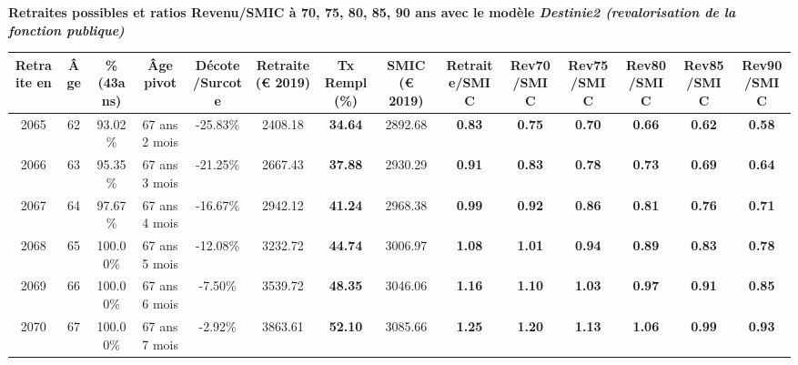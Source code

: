  \vspace{0.1cm} 
{\bf \noindent Retraites possibles et ratios Revenu/SMIC à 70, 75, 80, 85, 90 ans avec le modèle \emph{Destinie2 (revalorisation de la fonction publique)}}  
 
\begin{adjustbox}{max width=\textwidth} 
\begin{tabular}[htb]{|c|c||c|c|c||c|c||c||c|c|c|c|c|c|} 
\hline 
 Retraite en &  Âge &  \%(43ans) &  Âge pivot &  Décote/Surcote &  Retraite (\euro{} 2019) &  Tx Rempl(\%) &  SMIC (\euro{} 2019) &  Retraite/SMIC &  Rev70/SMIC &  Rev75/SMIC &  Rev80/SMIC &  Rev85/SMIC &  Rev90/SMIC \\ 
\hline \hline 
 2065 &  62 &  93.02\% &  67 ans 2 mois &  -25.83\% &  2408.18 &  {\bf 34.64} &  2892.68 &  {\bf {\color{red} 0.83}} &  {\bf {\color{red} 0.75}} &  {\bf {\color{red} 0.70}} &  {\bf {\color{red} 0.66}} &  {\bf {\color{red} 0.62}} &  {\bf {\color{red} 0.58}} \\ 
\hline 
 2066 &  63 &  95.35\% &  67 ans 3 mois &  -21.25\% &  2667.43 &  {\bf 37.88} &  2930.29 &  {\bf {\color{red} 0.91}} &  {\bf {\color{red} 0.83}} &  {\bf {\color{red} 0.78}} &  {\bf {\color{red} 0.73}} &  {\bf {\color{red} 0.69}} &  {\bf {\color{red} 0.64}} \\ 
\hline 
 2067 &  64 &  97.67\% &  67 ans 4 mois &  -16.67\% &  2942.12 &  {\bf 41.24} &  2968.38 &  {\bf {\color{red} 0.99}} &  {\bf {\color{red} 0.92}} &  {\bf {\color{red} 0.86}} &  {\bf {\color{red} 0.81}} &  {\bf {\color{red} 0.76}} &  {\bf {\color{red} 0.71}} \\ 
\hline 
 2068 &  65 &  100.00\% &  67 ans 5 mois &  -12.08\% &  3232.72 &  {\bf 44.74} &  3006.97 &  {\bf 1.08} &  {\bf 1.01} &  {\bf {\color{red} 0.94}} &  {\bf {\color{red} 0.89}} &  {\bf {\color{red} 0.83}} &  {\bf {\color{red} 0.78}} \\ 
\hline 
 2069 &  66 &  100.00\% &  67 ans 6 mois &  -7.50\% &  3539.72 &  {\bf 48.35} &  3046.06 &  {\bf 1.16} &  {\bf 1.10} &  {\bf 1.03} &  {\bf {\color{red} 0.97}} &  {\bf {\color{red} 0.91}} &  {\bf {\color{red} 0.85}} \\ 
\hline 
 2070 &  67 &  100.00\% &  67 ans 7 mois &  -2.92\% &  3863.61 &  {\bf 52.10} &  3085.66 &  {\bf 1.25} &  {\bf 1.20} &  {\bf 1.13} &  {\bf 1.06} &  {\bf {\color{red} 0.99}} &  {\bf {\color{red} 0.93}} \\ 
\hline 
\hline 
\end{tabular} 
\end{adjustbox} 
 
